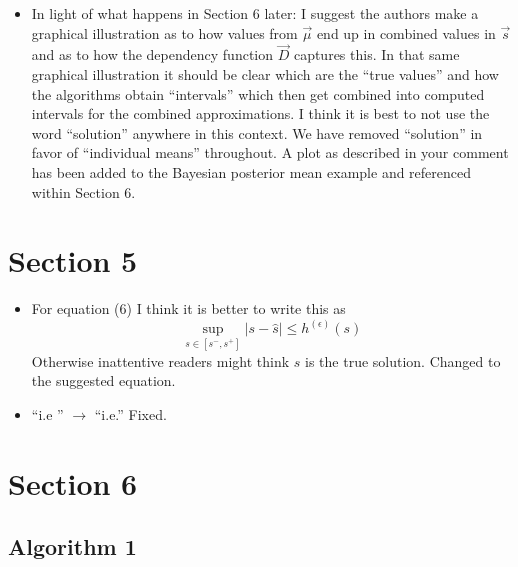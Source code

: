 \documentclass{article}[12pt]
\newcommand{\Referee}[1]{{\color{blue} #1 \newline}}
\begin{document}
\begin{itemize}
    \item \Referee{In light of what happens in Section 6 later: I suggest the authors make a graphical illustration as to how values from $\vec{\mu}$ end up in combined values in $\vec{s}$ and as to how the dependency function $\vec{D}$ captures this. In that same graphical illustration it should be clear which are the ``true values'' and how the algorithms obtain ``intervals'' which then get combined into computed intervals for the combined approximations. I think it is best to not use the word ``solution'' anywhere in this context.}We have removed ``solution'' in favor of ``individual means'' throughout. A plot as described in your comment has been added to the Bayesian posterior mean example and referenced within Section 6.
\end{itemize}

\section*{Section 5}

\begin{itemize}
    \item \Referee{For equation (6) I think it is better to write this as
    $$\sup_{s \in [s^-, s^+]} |s - \hat{s}| \le h^{(\epsilon)}(s)$$
  Otherwise inattentive readers might think $s$ is the true solution.}Changed to the suggested equation. 
  \item \Referee{``i.e '' $\to$ ``i.e.''}Fixed.
\end{itemize}

\section*{Section 6}

\subsection*{Algorithm 1}
\end{document}
